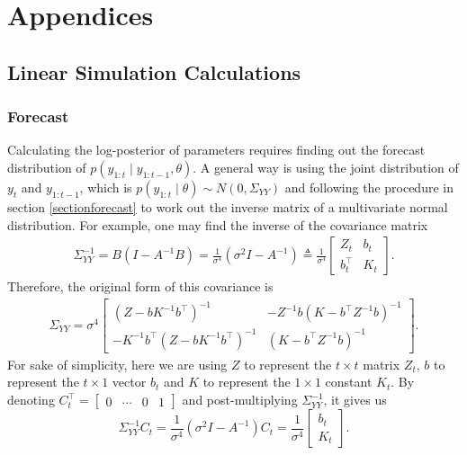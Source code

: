 \section{Appendices}

\subsection{Linear Simulation Calculations}\label{linearcalculation}

\subsubsection*{Forecast} 



Calculating the log-posterior of parameters requires finding out the forecast distribution of $p(y_{1:t}\mid y_{1:t-1},\theta)$. A general way is using the joint distribution of $y_{t}$ and $y_{1:t-1}$, which is $p(y_{1:t}\mid \theta)\sim N(0,\Sigma_{YY})$ and following the procedure in section \ref{sectionforecast} to work out the inverse matrix of a multivariate normal distribution. For example, one may find the inverse of the covariance matrix 
\begin{align*}
\Sigma_{YY}^{-1} = B(I-A^{-1}B) =\frac{1}{\sigma^4}(\sigma^2 I-A^{-1}) \triangleq \frac{1}{\sigma^4} \left[\begin{matrix} 
Z_{t} & b_{t} \\
b_{t}^\top & K_{t}
\end{matrix} \right].
\end{align*}
Therefore, the original form of this covariance is 
\begin{align*} \Sigma_{YY} =\sigma^4 \left[ \begin{matrix}
(Z-bK^{-1}b^\top)^{-1} & -Z^{-1}b(K-b^\top Z^{-1}b)^{-1}\\
-K^{-1}b^\top (Z-bK^{-1}b^\top)^{-1} & (K-b^\top Z^{-1}b)^{-1}
\end{matrix}\right].
\end{align*}
For sake of simplicity, here we are using $Z$ to represent the $t\times t$ matrix $Z_{t}$, $b$ to represent the $t \times 1$ vector  $b_{t}$  and $K$ to represent the $1\times 1$ constant $K_{t}$. By denoting $C_{t}^\top = \begin{bmatrix} 0 & \cdots & 0 & 1\end{bmatrix}$ and post-multiplying $\Sigma_{YY}^{-1}$, it gives us 
\begin{equation}
\Sigma_{YY}^{-1} C_{t}= \frac{1}{\sigma^4}(\sigma^2 I-A^{-1}) C_{t}= \frac{1}{\sigma^4} \left[\begin{matrix} b_{t} \\ K_{t} \end{matrix} \right].
\end{equation} 

